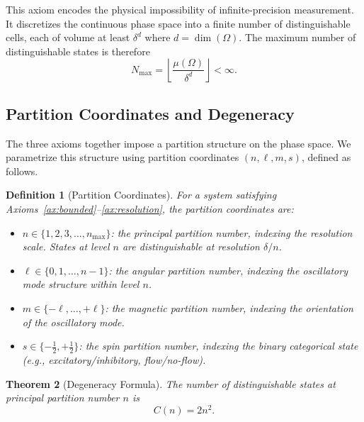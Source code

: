 \documentclass[aps,prd,twocolumn,superscriptaddress,floatfix,nofootinbib]{revtex4-2}
\newtheorem{theorem}{Theorem}[section]
\newtheorem{definition}[theorem]{Definition}
\theoremstyle{remark}
\begin{document}
This axiom encodes the physical impossibility of infinite-precision measurement. It discretizes the continuous phase space into a finite number of distinguishable cells, each of volume at least $\delta^d$ where $d = \dim(\Omega)$. The maximum number of distinguishable states is therefore
\begin{equation}
    N_{\max} = \left\lfloor \frac{\mu(\Omega)}{\delta^d} \right\rfloor < \infty.
    \label{eq:nmax}
\end{equation}

\subsection{Partition Coordinates and Degeneracy}

The three axioms together impose a partition structure on the phase space. We parametrize this structure using partition coordinates $(n, \ell, m, s)$, defined as follows.

\begin{definition}[Partition Coordinates]
\label{def:partition_coords}
For a system satisfying Axioms~\ref{ax:bounded}--\ref{ax:resolution}, the partition coordinates are:
\begin{itemize}
    \item $n \in \{1, 2, 3, \ldots, n_{\max}\}$: the \emph{principal partition number}, indexing the resolution scale. States at level $n$ are distinguishable at resolution $\delta / n$.
    \item $\ell \in \{0, 1, \ldots, n-1\}$: the \emph{angular partition number}, indexing the oscillatory mode structure within level $n$.
    \item $m \in \{-\ell, \ldots, +\ell\}$: the \emph{magnetic partition number}, indexing the orientation of the oscillatory mode.
    \item $s \in \{-\tfrac{1}{2}, +\tfrac{1}{2}\}$: the \emph{spin partition number}, indexing the binary categorical state (e.g., excitatory/inhibitory, flow/no-flow).
\end{itemize}
\end{definition}

\begin{theorem}[Degeneracy Formula]
\label{thm:degeneracy}
The number of distinguishable states at principal partition number $n$ is
\begin{equation}
    \boxed{C(n) = 2n^2.}
    \label{eq:degeneracy}
\end{equation}
\end{theorem}
\end{document}
